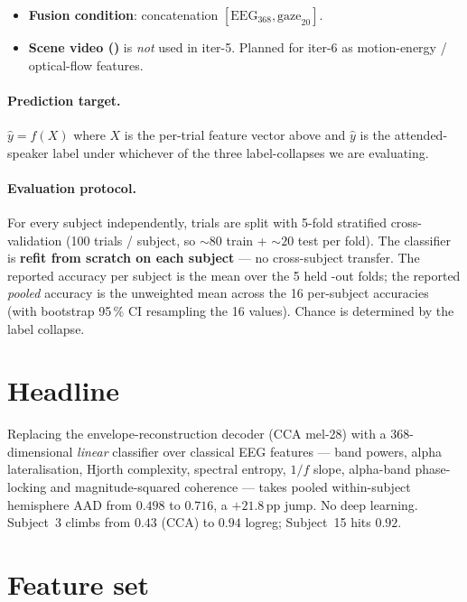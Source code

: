 \begin{itemize}
  \setcounter{enumi}{2}
  \item \textbf{Fusion condition}: concatenation $[\text{EEG}_{368},
        \text{gaze}_{20}]$.
  \item \textbf{Scene video ()} is \emph{not} used
        in iter-5. Planned for iter-6 as motion-energy / optical-flow
        features.
\end{itemize}

\paragraph{Prediction target.} $\hat{y} = f(X)$ where $X$ is the
per-trial feature vector above and $\hat{y}$ is the attended-speaker
label under whichever of the three label-collapses we are evaluating.

\paragraph{Evaluation protocol.} For every subject independently, trials
are split with 5-fold stratified cross-validation (100 trials / subject,
so $\sim 80$ train + $\sim 20$ test per fold). The classifier is
\textbf{refit from scratch on each subject} --- no cross-subject
transfer. The reported accuracy per subject is the mean over the 5 held
-out folds; the reported \emph{pooled} accuracy is the unweighted mean
across the 16 per-subject accuracies (with bootstrap 95\,\% CI resampling
the 16 values). Chance is determined by the label collapse.

\section*{Headline}

Replacing the envelope-reconstruction decoder (CCA mel-28) with a
368-dimensional \emph{linear} classifier over classical EEG features ---
band powers, alpha lateralisation, Hjorth complexity, spectral entropy,
$1/f$ slope, alpha-band phase-locking and magnitude-squared coherence ---
takes pooled within-subject hemisphere AAD from $0.498$ to
$\mathbf{0.716}$, a $+21.8$\,pp jump. No deep learning. Subject~3 climbs
from $0.43$ (CCA) to $\mathbf{0.94}$ logreg; Subject~15 hits $\mathbf{0.92}$.

\section{Feature set}

